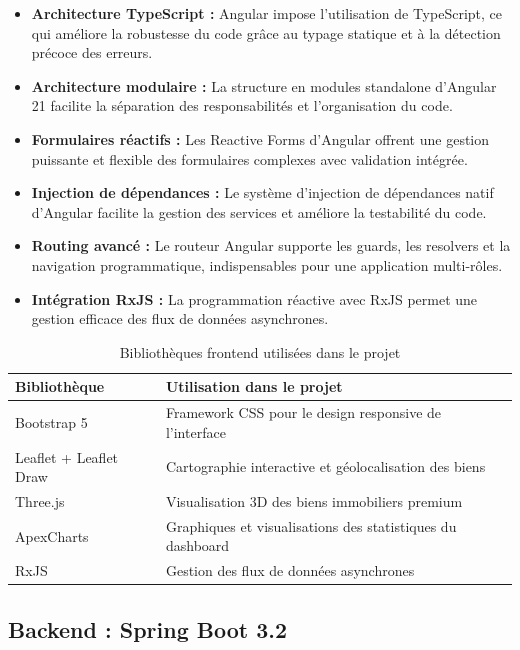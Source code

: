 \documentclass[a4paper,12pt]{report}
\begin{document}
\begin{itemize}
    \item \textbf{Architecture TypeScript :} Angular impose l'utilisation de TypeScript, ce qui améliore la robustesse du code grâce au typage statique et à la détection précoce des erreurs.
    \item \textbf{Architecture modulaire :} La structure en modules standalone d'Angular 21 facilite la séparation des responsabilités et l'organisation du code.
    \item \textbf{Formulaires réactifs :} Les Reactive Forms d'Angular offrent une gestion puissante et flexible des formulaires complexes avec validation intégrée.
    \item \textbf{Injection de dépendances :} Le système d'injection de dépendances natif d'Angular facilite la gestion des services et améliore la testabilité du code.
    \item \textbf{Routing avancé :} Le routeur Angular supporte les guards, les resolvers et la navigation programmatique, indispensables pour une application multi-rôles.
    \item \textbf{Intégration RxJS :} La programmation réactive avec RxJS permet une gestion efficace des flux de données asynchrones.
\end{itemize}

\begin{table}[H]
\centering
\begin{tabular}{|p{4cm}|p{10cm}|}
\hline
\textbf{Bibliothèque} & \textbf{Utilisation dans le projet} \\
\hline
Bootstrap 5 & Framework CSS pour le design responsive de l'interface \\
\hline
Leaflet + Leaflet Draw & Cartographie interactive et géolocalisation des biens \\
\hline
Three.js & Visualisation 3D des biens immobiliers premium \\
\hline
ApexCharts & Graphiques et visualisations des statistiques du dashboard \\
\hline
RxJS & Gestion des flux de données asynchrones \\
\hline
\end{tabular}
\caption{Bibliothèques frontend utilisées dans le projet}
\end{table}

\subsection{Backend : Spring Boot 3.2}
\end{document}
